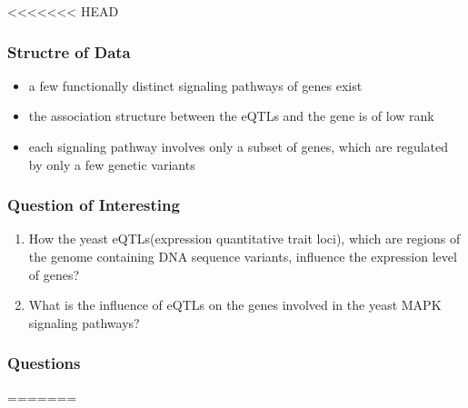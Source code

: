 \begin{frame}
\begin{itemize}
<<<<<<< HEAD
\begin{frame}\frametitle{Structre of Data}
    \begin{itemize}
        \item a few functionally distinct signaling pathways of genes exist
        \item the association structure between the eQTLs and the gene is of low rank
        \item each signaling pathway involves only a subset of genes, which are regulated by only a few genetic variants
    \end{itemize}
\end{frame}



   

\begin{frame}\frametitle{Question of Interesting}
    \begin{enumerate}
        \item How the yeast eQTLs(expression quantitative trait loci), which are regions of the genome containing DNA sequence variants, influence the expression level of genes? 
        \item What is the influence of eQTLs on the genes involved in the yeast MAPK signaling pathways?
    \end{enumerate}
\end{frame}

\begin{frame}\frametitle{ Questions}
=======




\end{frame}
\end{itemize}
\end{frame}
